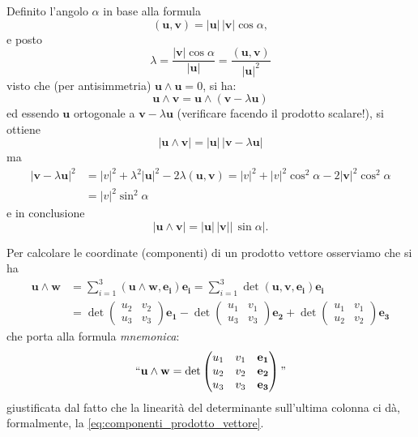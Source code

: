 \documentclass[italian,a4paper]{scrartcl}
\newcommand{\defeq}{=}
\renewcommand{\vec}{\mathbf}
\begin{document}
Definito l'angolo $\alpha$ in base alla formula
\[
  (\vec u, \vec v) = \lvert \vec u \rvert\, \lvert \vec v \rvert \cos \alpha,
\]
e posto 
\[
 \lambda \defeq \frac{\lvert\vec v\rvert \cos \alpha}{\lvert \vec u\rvert}
  = \frac{(\vec u,\vec v)}{\lvert \vec u \rvert^2}
\]
visto che (per antisimmetria) $\vec u \wedge \vec u = 0$, 
si ha:
\[
\vec u \wedge \vec v = \vec u \wedge (\vec v - \lambda\vec u)
\]
ed essendo $\vec u$ ortogonale a $\vec v - \lambda \vec u$ (verificare
facendo il prodotto scalare!), si
ottiene
\[
\lvert \vec u \wedge \vec v\rvert = \lvert \vec u \rvert \, \lvert
\vec v -\lambda \vec u\rvert
\]
ma
\begin{align*}
\lvert \vec v-\lambda \vec u\rvert^2
&= \lvert v\rvert^2 + \lambda^2 \lvert \vec u \rvert^2 - 2 \lambda
(\vec u, \vec v) 
= \lvert v \rvert^2 + \lvert v\rvert^2 \cos^2 \alpha - 2 \lvert \vec
v\rvert^2 \cos^2 \alpha \\
&=\lvert v\rvert^2 \sin^2 \alpha
\end{align*}
e in conclusione
\[
 \lvert \vec u \wedge \vec v \rvert = \lvert \vec u\rvert \, \lvert
 \vec v \rvert \lvert\, \sin\alpha\rvert.
\]

Per calcolare le coordinate (componenti) di un prodotto vettore
osserviamo che si ha
\begin{equation}
\label{eq:componenti_prodotto_vettore}
\begin{aligned}
  \vec u \wedge \vec w &= \sum_{i=1}^3 (\vec u\wedge \vec w,\vec{e_i}) \vec{e_i}
  = \sum_{i=1}^3 \det(\vec u, \vec v, \vec{e_i}) \vec{e_i}\\
  &=
    \det\begin{pmatrix}u_2 & v_2 \\ u_3 & v_3\end{pmatrix} \vec{e_1}
  - \det\begin{pmatrix}u_1 & v_1 \\ u_3 & v_3\end{pmatrix} \vec{e_2}
  + \det\begin{pmatrix}u_1 & v_1 \\ u_2 & v_2\end{pmatrix} \vec{e_3}
  \end{aligned}
\end{equation}
che porta alla formula \emph{mnemonica}:
\[
\text{``\mbox{}}\vec u \wedge \vec w = \det\begin{pmatrix}
  u_1 & v_1 & \vec{e_1} \\
  u_2 & v_2 & \vec{e_2} \\
  u_3 & v_3 & \vec{e_3}
\end{pmatrix}\text{''}
\]
giustificata dal fatto che la linearità del determinante sull'ultima
colonna ci dà, 
formalmente, la \eqref{eq:componenti_prodotto_vettore}.
\end{document}
